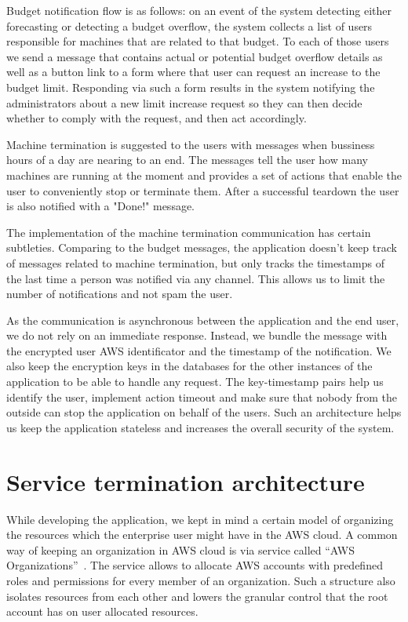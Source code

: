 \documentclass[licencjacka,en]{thesisclass}
\begin{document}
    Budget notification flow is as follows: on an event of the system detecting
    either forecasting or detecting a budget overflow, the system collects
    a list of users responsible for machines that are related to that budget.
    To each of those users we send a message that contains actual or potential
    budget overflow details as well as a button link to a form where that user can request
    an increase to the budget limit.
    Responding via such a form results in the system notifying the administrators
    about a new limit increase request so they can then decide whether to comply
    with the request, and then act accordingly.

    Machine termination is suggested to the users with messages
    when bussiness hours of a day are nearing to an end.
    The messages tell the user how many machines are running at the moment
    and provides a set of actions that enable the user to conveniently stop
    or terminate them.
    After a successful teardown the user is also notified with a "Done!" message.

    The implementation of the machine termination communication has certain subtleties.
    Comparing to the budget messages, the application doesn’t keep track of messages
    related to machine termination, but
    only tracks the timestamps of the last time a person was notified via any channel.
    This allows us to limit the number of notifications and not spam the user.

    As the communication is asynchronous between the application and the end user,
    we do not rely on an immediate response.
    Instead, we bundle the message with the encrypted user AWS identificator
    and the timestamp of the notification.
    We also keep the encryption keys in the databases for the other instances
    of the application to be able to handle any request.
    The key-timestamp pairs help us identify the user, implement action timeout
    and make sure that nobody from the outside can stop the application
    on behalf of the users.
    Such an architecture helps us keep the application stateless
    and increases the overall security of the system.

    \section{Service termination architecture}
    While developing the application, we kept in mind a certain model
    of organizing the resources
    which the enterprise user might have in the AWS cloud.
    A common way of keeping an organization in AWS cloud
    is via service called “AWS Organizations”~\cite{AWSOrganizations}.
    The service allows to allocate AWS accounts
    with predefined roles and permissions for every member of an organization.
    Such a structure also isolates resources from each other
    and lowers the granular control that the root account has on user allocated resources.
\end{document}
